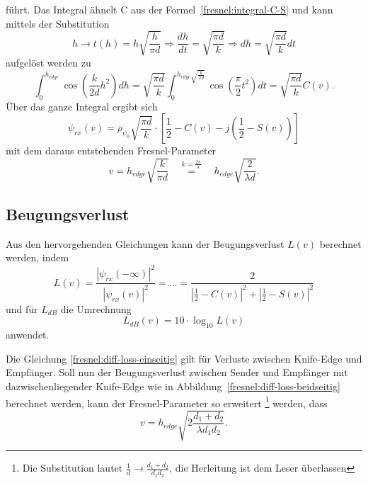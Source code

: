 führt.
Das Integral ähnelt C aus der Formel~\eqref{fresnel:integral-C-S} und kann mittels der Substitution
\[
h
\to
t(h)
=
h\sqrt{\frac{h}{\pi d}}
\Rightarrow
\frac{dh}{dt}
=
\sqrt{\frac{\pi d}{k}}
\Rightarrow
dh
=
\sqrt{\frac{\pi d}{k}} dt
\]
aufgelöst werden zu
\begin{equation*}
    \int_{0}^{h_{edge}} \cos \left(\frac{k}{2d}h^2\right) dh
    =
    \sqrt{\frac{\pi d}{k}} \int_{0}^{h_{edge}\sqrt{\frac{k}{\pi d}}} \cos \left(\frac{\pi}{2}t^2\right) dt
    =
    \sqrt{\frac{\pi d}{k}} C(v).
\end{equation*}
Über das ganze Integral ergibt sich
\begin{equation}
    \psi_{rx} (v)
    =
    \rho_{\psi_0} \sqrt{\frac{\pi d}{k}} \cdot \left[\frac{1}{2} - C(v) -j\left(\frac{1}{2}-S(v)\right)\right]
\end{equation}
mit dem daraus entstehenden Fresnel-Parameter
\begin{equation}
    v
    =
    h_{edge} \sqrt{\frac{k}{\pi d}}
    \quad
    \overset{k = \frac{2 \pi}{\lambda}}{=}
    \quad
    h_{edge} \sqrt{\frac{2}{\lambda d}}.
\end{equation}

\subsection{Beugungsverlust}
Aus den hervorgehenden Gleichungen kann der Beugungsverlust $L(v)$ berechnet werden, indem
\begin{equation}
    L(v)
    =
    \frac{|\psi_{rx} (-\infty)|^2}{|\psi_{rx} (v)|^2}
    =
    \dots
    =
    \frac{2}{\left|\frac{1}{2}-C(v)\right|^2 + \left|\frac{1}{2}-S(v)\right|^2}
    \label{fresnel:diff-loss-einseitig}
\end{equation}
und für $L_{dB}$ die Umrechnung
\[
L_{dB} (v)
=
10 \cdot \log_{10}L(v)
\]
anwendet.

Die Gleichung \eqref{fresnel:diff-loss-einseitig} gilt für Verluste zwischen Knife-Edge und Empfänger. 
Soll nun der Beugungsverlust zwischen Sender und Empfänger mit dazwischenliegender Knife-Edge wie in Abbildung~\ref{fresnel:diff-loss-beidseitig} berechnet
werden, kann der Fresnel-Parameter so erweitert %
\footnote{Die Substitution lautet $\frac{1}{d} \to \frac{d_1 + d_2}{d_1d_2}$, die Herleitung ist dem Leser überlassen} 
werden, dass
\begin{equation}
    v
    =
    h_{edge} \sqrt{2\frac{d_1 + d_2}{\lambda d_1 d_2}}.
\end{equation}

